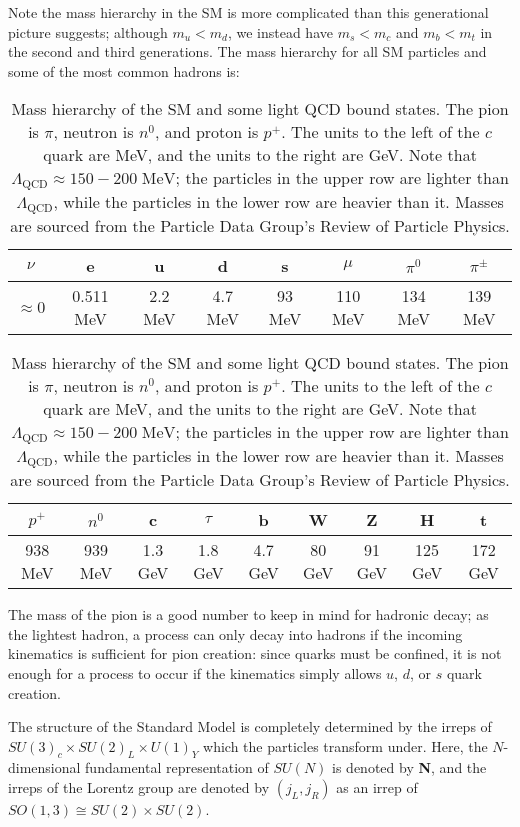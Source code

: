 \documentclass[11pt, oneside]{article}   	%
\theoremstyle{definition}
\begin{document}
Note the mass hierarchy in the SM is more complicated than this generational picture suggests; although $m_u < m_d$, 
we instead have $m_s < m_c$ and $m_b < m_t$ in the second and third generations. The mass hierarchy for all SM particles 
and some of the most common hadrons is:
\begin{table}[H]
	\centering
	\begin{tabular}{ | c | c | c | c | c | c | c | c | }
		\hline
		$\nu$ & e & u & d & s & $\mu$ & $\pi^0$ & $\pi^\pm$ \\
		\hline
		$\approx 0$ & 0.511 MeV & 2.2 MeV & 4.7 MeV & 93 MeV & 110 MeV & 134 MeV & 139 MeV \\
		\hline
	\end{tabular}
		\begin{tabular}{ | c | c | c | c | c | c | c | c | c | }
		\hline
		$p^+$ & $n^0$ & c & $\tau$ & b & W & Z & H & t \\
		\hline
		938 MeV & 939 MeV & 1.3 GeV & 1.8 GeV & 4.7 GeV & 80 GeV & 91 GeV & 125 GeV & 172 GeV \\
		\hline
	\end{tabular}
	\caption{Mass hierarchy of the SM and some light QCD bound states. The pion is $\pi$, neutron is $n^0$, 
	and proton is $p^+$. The units to the left of the $c$ quark are MeV, and the units to the right are GeV. Note that 
	$\Lambda_\mathrm{QCD}\approx 150 - 200\;\mathrm{MeV}$; the particles in the upper row are lighter than $\Lambda_\mathrm{QCD}$, 
	while the particles in the lower row are heavier than it. Masses are sourced from the Particle Data Group's Review of 
	Particle Physics.}
\end{table}

The mass of the pion is a good number to keep in mind for hadronic decay; as the lightest hadron, a process can only decay into hadrons 
if the incoming kinematics is sufficient for pion creation: since quarks must be confined, it is not enough for a process to occur if 
the kinematics simply allows $u$, $d$, or $s$ quark creation.

The structure of the Standard Model is completely determined by the irreps of $SU(3)_c\times SU(2)_L\times 
U(1)_Y$ which the particles transform under. Here, the $N$-dimensional fundamental representation of $SU(N)$ is denoted by 
\textbf{N}, and the irreps of the Lorentz group are denoted by $(j_L, j_R)$ as an irrep of $SO(1, 3)\cong SU(2)\times SU(2)$. 
\end{document}
